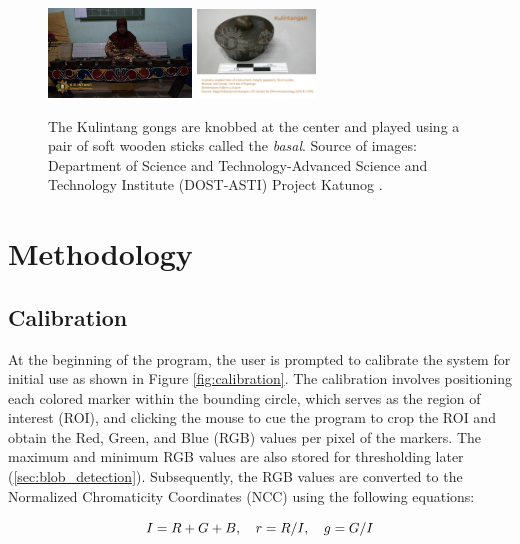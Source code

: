 \documentclass[10pt,a4paper,twoside]{article}
\begin{document}
\begin{figure}[h!]
\centering
\includegraphics[width=0.34\textwidth]{MR_KULINTANG.jpeg}\label{fig:kulintang}
\quad %
\includegraphics[width=0.28\textwidth]{Kulintangan (275b).png}\label{fig:gong}
\caption{The Kulintang gongs are knobbed at the center and played using a pair of soft wooden sticks called the \emph{basal}. Source of images: Department of Science and Technology-Advanced Science and Technology Institute (DOST-ASTI) Project Katunog \cite{philippine_copyright_2023_by_dost-asti_and_up_kulintang_2019, philippine_copyright_2023_by_dost-asti_and_up_kulintangan_2019}.}
\label{fig:Kulintangan}
\end{figure}



\section{Methodology}\label{sec:methodology}

\subsection{Calibration}\label{sec:calibration} 
At the beginning of the program, the user is prompted to calibrate the system for initial use as shown in Figure \ref{fig:calibration}. The calibration involves positioning each colored marker within the bounding circle, which serves as the region of interest (ROI), and clicking the mouse to cue the program to crop the ROI and obtain the Red, Green, and Blue (RGB) values per pixel of the markers. The maximum and minimum RGB values are also stored for thresholding later (\ref{sec:blob_detection}). Subsequently, the RGB values are converted to the Normalized Chromaticity Coordinates (NCC) using the following equations:

\begin{equation}
    \centering
    I = R + G + B, \quad
    r = R/I, \quad
    g = G/I
\end{equation}{}
\end{document}
